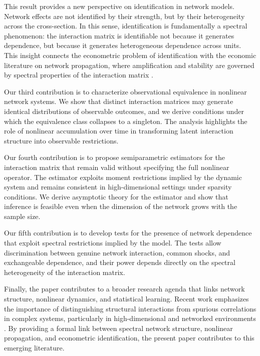 \documentclass[12pt]{article}
\numberwithin{equation}{section}
\begin{document}
This result provides a new perspective on identification in network models. Network effects are not identified by their strength, but by their heterogeneity across the cross-section. In this sense, identification is fundamentally a spectral phenomenon: the interaction matrix is identifiable not because it generates dependence, but because it generates heterogeneous dependence across units. This insight connects the econometric problem of identification with the economic literature on network propagation, where amplification and stability are governed by spectral properties of the interaction matrix \citep{acemoglu2012network, acemoglu2015systemic, elliott2014financial}.

Our third contribution is to characterize observational equivalence in nonlinear network systems. We show that distinct interaction matrices may generate identical distributions of observable outcomes, and we derive conditions under which the equivalence class collapses to a singleton. The analysis highlights the role of nonlinear accumulation over time in transforming latent interaction structure into observable restrictions.

Our fourth contribution is to propose semiparametric estimators for the interaction matrix that remain valid without specifying the full nonlinear operator. The estimator exploits moment restrictions implied by the dynamic system and remains consistent in high-dimensional settings under sparsity conditions. We derive asymptotic theory for the estimator and show that inference is feasible even when the dimension of the network grows with the sample size.

Our fifth contribution is to develop tests for the presence of network dependence that exploit spectral restrictions implied by the model. The tests allow discrimination between genuine network interaction, common shocks, and exchangeable dependence, and their power depends directly on the spectral heterogeneity of the interaction matrix.

Finally, the paper contributes to a broader research agenda that links network structure, nonlinear dynamics, and statistical learning. Recent work emphasizes the importance of distinguishing structural interactions from spurious correlations in complex systems, particularly in high-dimensional and networked environments \citep{vallarino2025causalgnn, zhou2025neuralfrailty}. By providing a formal link between spectral network structure, nonlinear propagation, and econometric identification, the present paper contributes to this emerging literature.
\end{document}
